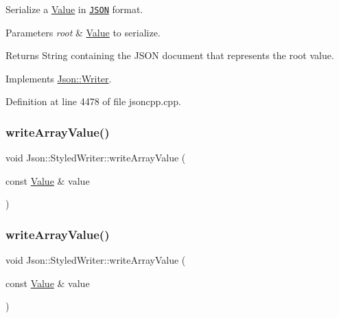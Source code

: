 Serialize a \hyperlink{class_json_1_1_value}{Value} in \href{http://www.json.org}{\tt J\+S\+ON} format. 


\begin{DoxyParams}{Parameters}
{\em root} & \hyperlink{class_json_1_1_value}{Value} to serialize. \\
\hline
\end{DoxyParams}
\begin{DoxyReturn}{Returns}
String containing the J\+S\+ON document that represents the root value. 
\end{DoxyReturn}


Implements \hyperlink{class_json_1_1_writer_a61c55882b82c7651d0b9b683c6d3f371}{Json\+::\+Writer}.



Definition at line 4478 of file jsoncpp.\+cpp.

\hypertarget{class_json_1_1_styled_writer_a0618c23d62965515def15ece1e677f5d}{}\label{class_json_1_1_styled_writer_a0618c23d62965515def15ece1e677f5d} 
\subsubsection{\texorpdfstring{write\+Array\+Value()}{writeArrayValue()}\hspace{0.1cm}{\footnotesize\ttfamily [1/2]}}
{\footnotesize\ttfamily void Json\+::\+Styled\+Writer\+::write\+Array\+Value (\begin{DoxyParamCaption}\item[{const \hyperlink{class_json_1_1_value}{Value} \&}]{value }\end{DoxyParamCaption})\hspace{0.3cm}{\ttfamily [private]}}

\hypertarget{class_json_1_1_styled_writer_a0618c23d62965515def15ece1e677f5d}{}\label{class_json_1_1_styled_writer_a0618c23d62965515def15ece1e677f5d} 
\subsubsection{\texorpdfstring{write\+Array\+Value()}{writeArrayValue()}\hspace{0.1cm}{\footnotesize\ttfamily [2/2]}}
{\footnotesize\ttfamily void Json\+::\+Styled\+Writer\+::write\+Array\+Value (\begin{DoxyParamCaption}\item[{const \hyperlink{class_json_1_1_value}{Value} \&}]{value }\end{DoxyParamCaption})\hspace{0.3cm}{\ttfamily [private]}}



